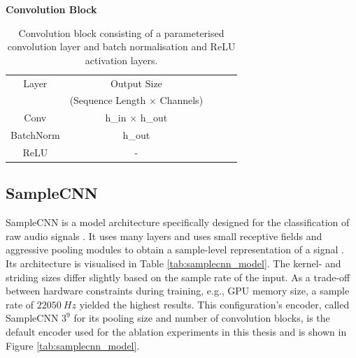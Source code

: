 \begin{table}
    \centering
    \textbf{Convolution Block} \\
    \begin{tabular}{ccccc}
        \toprule Layer & Output Size \\
        & (Sequence Length $\times$ Channels) \\\hline
        Conv & h\_in $\times$ h\_out \\
        BatchNorm & h\_out \\
        ReLU & - \\
        \bottomrule
    \end{tabular}
    \caption{Convolution block consisting of a parameterised convolution layer and batch normalisation and ReLU activation layers.}
    \label{tab:conv_block}
\end{table}


\subsection{SampleCNN}
SampleCNN is a model architecture specifically designed for the classification of raw audio signals \cite{lee2018samplecnn}. It uses many layers and uses small receptive fields and aggressive pooling modules to obtain a sample-level representation of a signal \cite{lee2018samplecnn}. Its architecture is visualised in Table \ref{tab:samplecnn_model}. The kernel- and striding sizes differ slightly based on the sample rate of the input. As a trade-off between hardware constraints during training, e.g., GPU memory size, a sample rate of $22050~Hz$ yielded the highest results. This configuration's encoder, called SampleCNN $3^9$ for its pooling size and number of convolution blocks, is the default encoder used for the ablation experiments in this thesis and is shown in Figure \ref{tab:samplecnn_model}.


